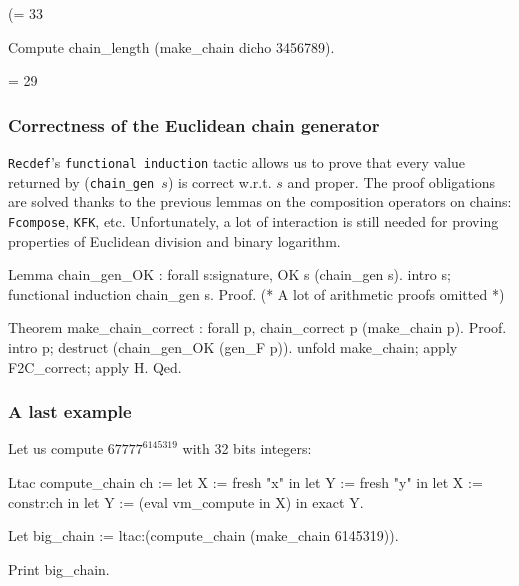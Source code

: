 \begin{Coqanswer}
(= 33%
\end{Coqanswer}

\begin{Coqsrc}
Compute chain_length (make_chain dicho 3456789).
\end{Coqsrc}

\begin{Coqanswer}
= 29%
\end{Coqanswer}


\subsubsection{Correctness of the Euclidean chain generator}

\texttt{Recdef}'s \texttt{functional induction} tactic allows us to
prove that every value returned by (\texttt{chain\_gen $s$}) is correct w.r.t. 
\texttt{$s$} and proper.
The proof obligations are solved thanks to the previous lemmas on 
the composition operators on chains: \texttt{Fcompose}, \texttt{KFK}, etc.
Unfortunately, a lot of interaction is still needed for proving properties of
Euclidean division and binary logarithm. 



\begin{Coqsrc}
Lemma chain_gen_OK : forall s:signature, OK  s (chain_gen  s).
intro s; functional induction chain_gen s.
Proof.
(* A lot of arithmetic proofs omitted *)

Theorem make_chain_correct :
    forall p, chain_correct p (make_chain p).
Proof.
 intro p; destruct (chain_gen_OK (gen_F p)).
 unfold make_chain; apply F2C_correct; apply H.
Qed.
\end{Coqsrc}

\subsubsection{A last example}
\label{ex45319}

Let us compute  $67777^{6145319}$ with 32 bits integers:

\begin{Coqsrc}

Ltac compute_chain ch := 
   let X := fresh "x" in 
   let Y := fresh "y" in
   let X := constr:ch in 
   let Y := (eval vm_compute in X) in 
   exact Y.

Let big_chain := ltac:(compute_chain  (make_chain 6145319)).

Print big_chain.
\end{Coqsrc}


